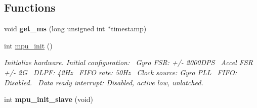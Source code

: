 \subsection*{Functions}
\begin{DoxyCompactItemize}
\item 
void {\bfseries get\+\_\+ms} (long unsigned int $\ast$timestamp)\hypertarget{group___d_r_i_v_e_r_s_gafa14dfea0eb6a2eb45bf1ef7b3f37311}{}\label{group___d_r_i_v_e_r_s_gafa14dfea0eb6a2eb45bf1ef7b3f37311}

\item 
int \hyperlink{group___d_r_i_v_e_r_s_ga63637cf3771995aeda99d91d5f345f29}{mpu\+\_\+init} ()
\begin{DoxyCompactList}\small\item\em Initialize hardware. Initial configuration\+:~\newline
Gyro F\+SR\+: +/-\/ 2000\+D\+PS~\newline
Accel F\+SR +/-\/ 2G~\newline
D\+L\+PF\+: 42\+Hz~\newline
F\+I\+FO rate\+: 50\+Hz~\newline
Clock source\+: Gyro P\+LL~\newline
F\+I\+FO\+: Disabled.~\newline
Data ready interrupt\+: Disabled, active low, unlatched. \end{DoxyCompactList}\item 
int {\bfseries mpu\+\_\+init\+\_\+slave} (void)\hypertarget{group___d_r_i_v_e_r_s_ga9093183fe619360b3b1bfb8aab030592}{}\label{group___d_r_i_v_e_r_s_ga9093183fe619360b3b1bfb8aab030592}


\end{DoxyCompactItemize}
